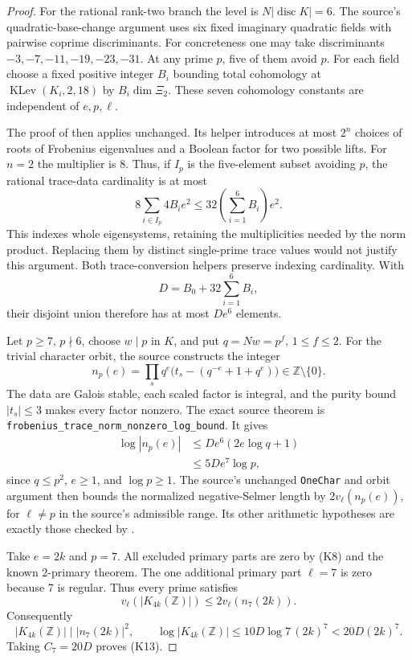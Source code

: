 \documentclass[11pt,a4paper]{article}
\theoremstyle{definition}
\begin{document}
\begin{proof}
For the rational rank-two branch the level is
\(N|\operatorname{disc}K|=6\).
The source's quadratic-base-change argument uses six fixed
imaginary quadratic fields with pairwise coprime discriminants.
For concreteness one may take discriminants
\(-3,-7,-11,-19,-23,-31\).
At any prime \(p\), five of them avoid \(p\).
For each field choose a fixed positive integer \(B_i\)
bounding total cohomology at
\(\operatorname{KLev}(K_i,2,18)\) by \(B_i\dim\Xi_2\).
These seven cohomology constants are independent of
\(e,p,\ell\).

The proof of
then applies unchanged. Its helper
 introduces at most \(2^n\)
choices of roots of Frobenius eigenvalues and a Boolean
factor for two possible lifts. For \(n=2\) the multiplier
is \(8\). Thus, if \(I_p\) is the five-element subset
avoiding \(p\), the rational trace-data cardinality is at most
\[
 8\sum_{i\in I_p}4B_i e^2
 \le32\left(\sum_{i=1}^6B_i\right)e^2.
\]
This indexes whole eigensystems, retaining the multiplicities
needed by the norm product. Replacing them by distinct
single-prime trace values would not justify this argument.
Both trace-conversion helpers preserve indexing cardinality.
With
\[
 D=B_0+32\sum_{i=1}^6B_i,
\]
their disjoint union therefore has at most \(De^6\) elements.

Let \(p\ge7\), \(p\nmid6\), choose \(w\mid p\) in \(K\), and put
\(q=Nw=p^f\), \(1\le f\le2\). For the trivial character
orbit, the source constructs the integer
\[
 n_p(e)=\prod_{s}
       q^e\bigl(t_s-(q^{-e}+1+q^e)\bigr)
       \in\mathbb Z\setminus\{0\}.                  \tag{K15}
\]
The data are Galois stable, each scaled factor is integral,
and the purity bound \(|t_s|\le3\) makes every factor nonzero.
The exact source theorem is
\texttt{frobenius\_trace\_norm\_nonzero\_log\_bound}.
It gives
\[
\begin{split}
 \log|n_p(e)|
 &\le De^6(2e\log q+1)\\
 &\le5De^7\log p,
\end{split}
\tag{K16}
\]
since \(q\le p^2\), \(e\ge1\), and \(\log p\ge1\).
The source's unchanged \texttt{OneChar} and orbit argument
then bounds the normalized negative-Selmer length by
\(2v_\ell(n_p(e))\), for \(\ell\ne p\) in the source's
admissible range. Its other arithmetic hypotheses are
exactly those checked by .

Take \(e=2k\) and \(p=7\). All excluded primary parts are
zero by (K8) and the known 2-primary theorem.
The one additional primary part \(\ell=7\) is zero because
7 is regular. Thus every prime satisfies
\[
 v_\ell(|K_{4k}(\mathbb Z)|)\le2v_\ell(n_7(2k)).
\]
Consequently
\[
 |K_{4k}(\mathbb Z)|\mid|n_7(2k)|^2,\qquad
 \log|K_{4k}(\mathbb Z)|
 \le10D\log7\,(2k)^7<20D(2k)^7.
\]
Taking \(C_7=20D\) proves (K13).
\end{proof}
\end{document}
